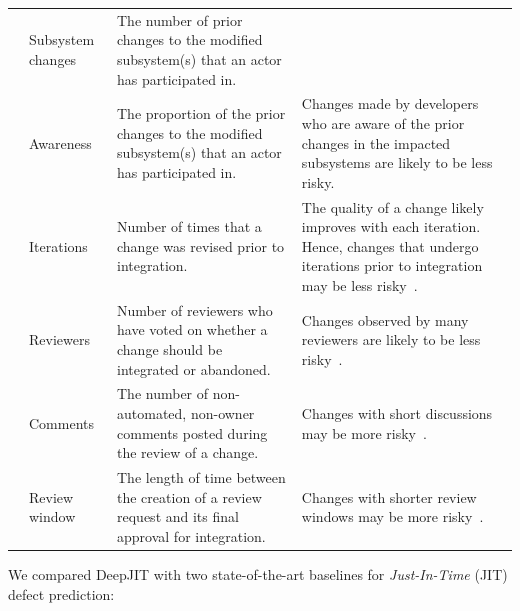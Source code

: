 \begin{table}[ht!]
{\begin{tabular}{|c|p{2cm}|p{5.7cm}|p{8.4cm}|}
			\cline{2-3}
			& Subsystem changes & The number of prior changes to the modified subsystem(s) that an actor has participated in. & \\
			\cline{2-4}
			& Awareness & The proportion of the prior changes to the modified subsystem(s) that an actor has participated in. & Changes made by developers who are aware of the prior changes in the impacted subsystems are likely to be less risky. \\
			\hline
			\multirow{12}{*}{\rotatebox{90}{Review}}
			& Iterations & Number of times that a change was revised prior to integration. & The quality of a change likely improves with each iteration. Hence, changes that undergo iterations prior to integration may be less risky~\cite{porter1998tosem, thongtanunam2015msr}.\\
			\cline{2-4}
			& Reviewers & Number of reviewers who have voted on whether a change should be integrated or abandoned. & Changes observed by many reviewers are likely to be less risky~\cite{Raymond2001}. \\
			\cline{2-4}
			& Comments & The number of non-automated, non-owner comments posted during the review of a change. & Changes with short discussions may be more risky~\cite{mcintosh2014impact, mcintosh2016empirical}.\\
			\cline{2-4}
			& Review window & The length of time between the creation of a review request and its final approval for integration. & Changes with shorter review windows may be more risky~\cite{porter1998tosem, thongtanunam2015msr}.\\
			\hline
		\end{tabular}
	}
\end{table}

We compared DeepJIT with two state-of-the-art baselines for \emph{Just-In-Time} (JIT) defect prediction:

